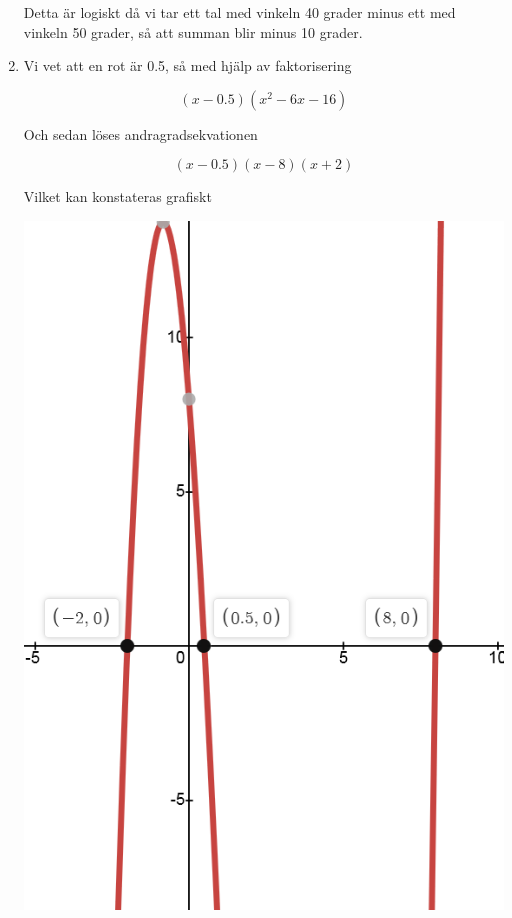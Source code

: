 \documentclass[a4paper,12pt]{article}
\begin{document}
\begin{enumerate}
          Detta är logiskt då vi tar ett tal med vinkeln 40 grader minus ett med vinkeln 50 grader,
          så att summan blir minus 10 grader.

          \item Vi vet att en rot är 0.5, så med hjälp av faktorisering 
          
          $$(x-0.5)(x^2-6x-16)$$
          
          Och sedan löses andragradsekvationen

          $$(x-0.5)(x-8)(x+2)$$

          Vilket kan konstateras grafiskt

          \begin{center}
                \includegraphics[scale=0.4]{Figur 4.png}
          \end{center}

\end{enumerate}
\end{document}

